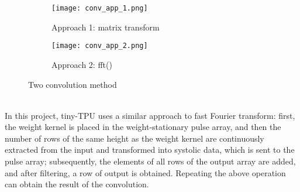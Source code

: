 \documentclass[12pt]{article}
\begin{document}
\begin{figure}[h]
\begin{center}
\begin{subfigure}{0.4\textwidth}
\begin{center}
\texttt{[image: conv\_app\_1.png]} 
\caption{Approach 1: matrix transform}
\label{fig:subim1}
\end{center}
\end{subfigure}
\begin{subfigure}{0.4\textwidth}
\begin{center}
\texttt{[image: conv\_app\_2.png]}
\caption{Approach 2: fft()}
\label{fig:subim2}
\end{center}
\end{subfigure}
\end{center}
\caption{Two convolution method}
\label{fig:image2}
\end{figure}
\\
In this project, tiny-TPU uses a similar approach to fast Fourier transform: first, the weight kernel is placed in the weight-stationary pulse array, and then the number of rows of the same height as the weight kernel are continuously extracted from the input and transformed into systolic data, which is sent to the pulse array; subsequently, the elements of all rows of the output array are added, and after filtering, a row of output is obtained. Repeating the above operation can obtain the result of the convolution. 
\end{document}

